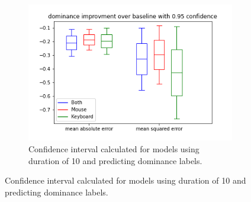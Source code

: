 \begin{figure}[!h]
\begin{subfigure}[b]{0.31\textwidth}
        \centering
        \includegraphics[width=\textwidth]{figures/results/interval_difference/10/10_dominance_0.95.png}
        \captionsetup{justification=centering}
        \caption{Confidence interval calculated for models using duration of 10 and predicting dominance labels.}
    \end{subfigure}
\end{figure}
